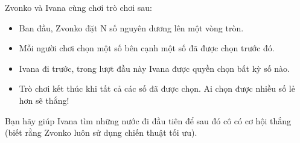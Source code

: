 Zvonko và Ivana cùng chơi trò chơi sau:  
\begin{itemize}
	\item     Ban đầu, Zvonko đặt N số nguyên dương lên một vòng tròn.   
	\item     Mỗi người chơi chọn một số bên cạnh một số đã được chọn trước đó.   
	\item     Ivana đi trước, trong lượt đầu này Ivana được quyền chọn bất kỳ số nào.   
	\item     Trò chơi kết thúc khi tất cả các số đã được chọn. Ai chọn được nhiều số lẻ hơn sẽ thắng!   
\end{itemize}

   Bạn hãy giúp Ivana tìm những nước đi đầu tiên để sau đó cô có cơ hội thắng (biết rằng Zvonko luôn sử dụng chiến thuật tối ưu).  

\
